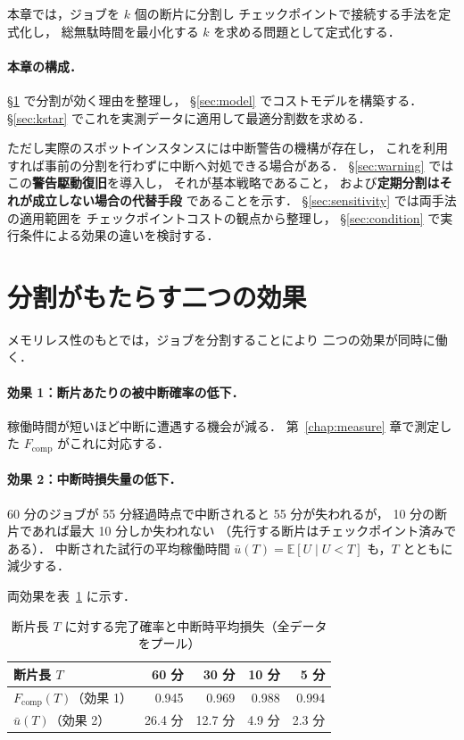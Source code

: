 \documentclass[11pt,a4paper]{ltjsreport}
\newcommand{\Fcomp}{F_{\mathrm{comp}}}
\newcommand{\E}{\mathbb{E}}
\begin{document}
本章では，ジョブを $k$ 個の断片に分割し
チェックポイントで接続する手法を定式化し，
総無駄時間を最小化する $k$ を求める問題として定式化する．

\paragraph{本章の構成．}
\S\ref{sec:two_effects} で分割が効く理由を整理し，
\S\ref{sec:model} でコストモデルを構築する．
\S\ref{sec:kstar} でこれを実測データに適用して最適分割数を求める．

ただし実際のスポットインスタンスには中断警告の機構が存在し，
これを利用すれば事前の分割を行わずに中断へ対処できる場合がある．
\S\ref{sec:warning} ではこの\textbf{警告駆動復旧}を導入し，
それが基本戦略であること，
および\textbf{定期分割はそれが成立しない場合の代替手段}
であることを示す．
\S\ref{sec:sensitivity} では両手法の適用範囲を
チェックポイントコストの観点から整理し，
\S\ref{sec:condition} で実行条件による効果の違いを検討する．

\section{分割がもたらす二つの効果}
\label{sec:two_effects}

メモリレス性のもとでは，ジョブを分割することにより
二つの効果が同時に働く．

\paragraph{効果 1：断片あたりの被中断確率の低下．}
稼働時間が短いほど中断に遭遇する機会が減る．
第~\ref{chap:measure} 章で測定した $\Fcomp$ がこれに対応する．

\paragraph{効果 2：中断時損失量の低下．}
60 分のジョブが 55 分経過時点で中断されると 55 分が失われるが，
10 分の断片であれば最大 10 分しか失われない
（先行する断片はチェックポイント済みである）．
中断された試行の平均稼働時間
$\bar u(T) = \E[U \mid U < T]$ も，$T$ とともに減少する．

両効果を表~\ref{tab:split_effect} に示す．

\begin{table}[htbp]
\centering
\caption{断片長 $T$ に対する完了確率と中断時平均損失（全データをプール）}
\label{tab:split_effect}
\small
\begin{tabular}{@{}lrrrr@{}}
\toprule
断片長 $T$ & 60 分 & 30 分 & 10 分 & 5 分 \\
\midrule
$\Fcomp(T)$（効果 1） & 0.945 & 0.969 & 0.988 & 0.994 \\
$\bar u(T)$（効果 2） & 26.4 分 & 12.7 分 & 4.9 分 & 2.3 分 \\
\bottomrule
\end{tabular}
\end{table}
\end{document}
